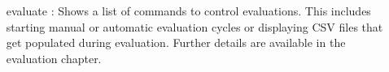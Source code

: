 \begin{itemize}
    \item [evaluate]:
        Shows a list of commands to control evaluations.
        This includes starting manual or automatic evaluation cycles or displaying CSV files that get populated during evaluation.
        Further details are available in the evaluation chapter.
\end{itemize}